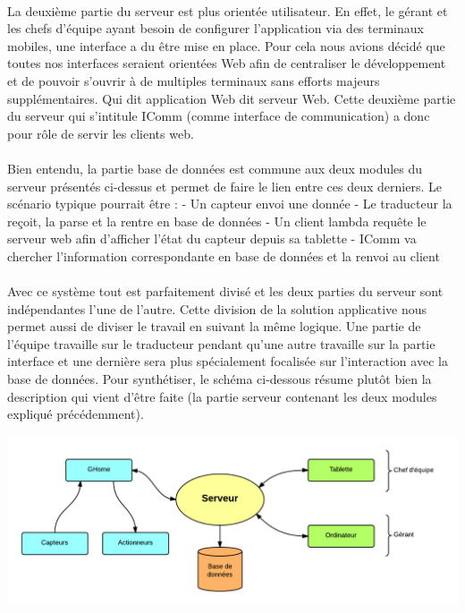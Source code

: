 \paragraph{}
La deuxième partie du serveur est plus orientée utilisateur. En effet, le gérant et les chefs d'équipe ayant besoin de configurer l'application via des terminaux mobiles, une interface a du être mise en place. Pour cela nous avions décidé que toutes nos interfaces seraient orientées Web afin de centraliser le développement et de pouvoir s'ouvrir à de multiples terminaux sans efforts majeurs supplémentaires. Qui dit application Web dit serveur Web. Cette deuxième partie du serveur qui s'intitule IComm (comme interface de communication) a donc pour rôle de servir les clients web.

\paragraph{}
Bien entendu, la partie base de données est commune aux deux modules du serveur présentés ci-dessus et permet de faire le lien entre ces deux derniers. Le scénario typique pourrait être :
- Un capteur envoi une donnée
- Le traducteur la reçoit, la parse et la rentre en base de données
- Un client lambda requête le serveur web afin d'afficher l'état du capteur depuis sa tablette
- IComm va chercher l'information correspondante en base de données et la renvoi au client

\paragraph{}
Avec ce système tout est parfaitement divisé et les deux parties du serveur sont indépendantes l'une de l'autre. Cette division de la solution applicative nous permet aussi de diviser le travail en suivant la même logique. Une partie de l'équipe travaille sur le traducteur pendant qu'une autre travaille sur la partie interface et une dernière sera plus spécialement focalisée sur l'interaction avec la base de données. Pour synthétiser, le schéma ci-dessous résume plutôt bien la description qui vient d'être faite (la partie serveur contenant les deux modules expliqué précédemment).

\includegraphics[scale=0.3]{image/architecture_materielle}

